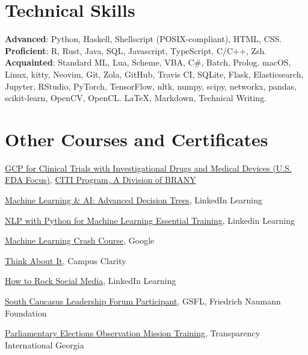 \documentclass[a4paper,10pt,sans]{moderncv}
\begin{document}


\section{Technical Skills}
         {\textbf{Advanced}: Python, Haskell, Shellscript (POSIX-compliant), HTML, CSS.\newline
          \textbf{Proficient}: R, Rust, Java, SQL, Javascript, TypeScript, C/C++, Zsh.\newline
          \textbf{Acquainted}: Standard ML, Lua, Scheme, VBA, C\#, Batch, Prolog.}
         {macOS, Linux, kitty, Neovim, Git, Zola, GitHub, Travis CI, SQLite,
          Flask, Elasticsearch, Jupyter, RStudio, PyTorch, TensorFlow, nltk,
          numpy, scipy, networkx, pandas, scikit-learn, OpenCV, OpenCL.}
         {\LaTeX, Markdown, Technical Writing.}



\section{Other Courses and Certificates}
         {\href{https://www.citiprogram.org/verify/?wbdb4adae-c0f7-4b2d-95c9-979fffad5efa-35263396}{GCP for Clinical Trials with Investigational Drugs and Medical Devices (U.S. FDA Focus)}, \href{https://about.citiprogram.org/en/homepage/}{CITI Program, A Division of BRANY}}

         {\href{https://www.linkedin.com/learning/machine-learning-ai-advanced-decision-trees}{Machine Learning \& AI: Advanced Decision Trees}, LinkedIn Learning}

         {\href{https://www.linkedin.com/learning/nlp-with-python-for-machine-learning-essential-training}{NLP with Python for Machine Learning Essential Training}, Linkedin Learning}

         {\href{https://developers.google.com/machine-learning/crash-course/}{Machine Learning Crash Course}, Google}

         {\href{https://www.davidoniani.com/assets/certificates/campus-clarity.jpg}{Think About It}, Campus Clarity}

         {\href{http://www.linkedin.com/learning/how-to-rock-social-media}{How to Rock Social Media}, LinkedIn Learning}

         {\href{https://www.davidoniani.com/assets/certificates/south-caucasus-leadership-forum-2016.jpg}{South Caucasus Leadership Forum Participant}, GSFL, Friedrich Naumann Foundation}

         {\href{https://www.transparency.ge/en}{Parliamentary Elections Observation Mission Training}, Transparency International Georgia}


\end{document}
